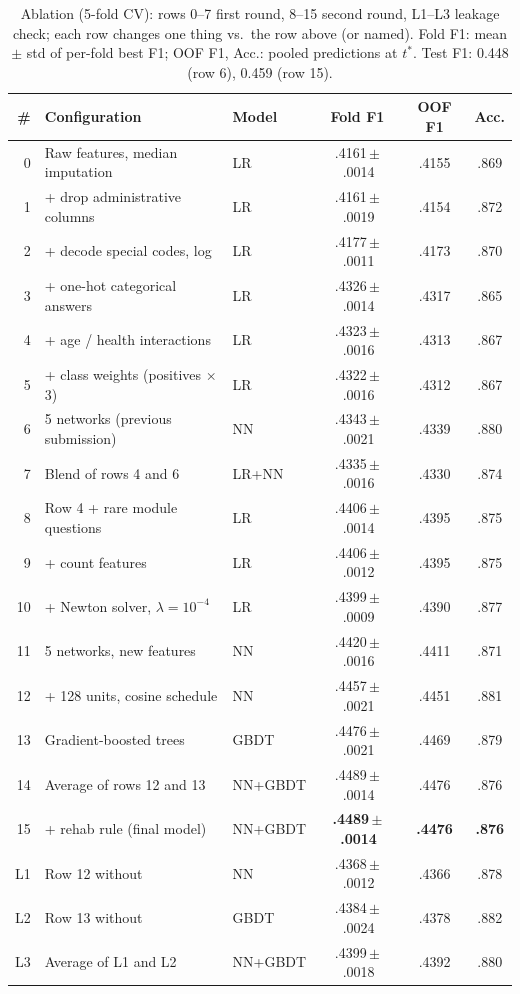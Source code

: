 \begin{table}[t]
\centering
\caption{Ablation (5-fold CV): rows 0--7 first round, 8--15 second round, L1--L3 leakage check; each row changes one thing vs.\ the row above (or named). Fold F1: mean $\pm$ std of per-fold best F1; OOF F1, Acc.: pooled predictions at $t^\ast$. Test F1: 0.448 (row 6), 0.459 (row 15).}
\label{tab:ablation}
\scriptsize
\setlength{\tabcolsep}{2.6pt}
\begin{tabular}{@{}rllccc@{}}
\toprule
\# & Configuration & Model & Fold F1 & OOF F1 & Acc. \\
\midrule
0 & Raw features, median imputation & LR & .4161\,$\pm$\,.0014 & .4155 & .869 \\
1 & + drop administrative columns & LR & .4161\,$\pm$\,.0019 & .4154 & .872 \\
2 & + decode special codes, log & LR & .4177\,$\pm$\,.0011 & .4173 & .870 \\
3 & + one-hot categorical answers & LR & .4326\,$\pm$\,.0014 & .4317 & .865 \\
4 & + age / health interactions & LR & .4323\,$\pm$\,.0016 & .4313 & .867 \\
5 & + class weights (positives $\times$3) & LR & .4322\,$\pm$\,.0016 & .4312 & .867 \\
6 & 5 networks (previous submission) & NN & .4343\,$\pm$\,.0021 & .4339 & .880 \\
7 & Blend of rows 4 and 6 & LR+NN & .4335\,$\pm$\,.0016 & .4330 & .874 \\
\midrule
8 & Row 4 + rare module questions & LR & .4406\,$\pm$\,.0014 & .4395 & .875 \\
9 & + count features & LR & .4406\,$\pm$\,.0012 & .4395 & .875 \\
10 & + Newton solver, $\lambda{=}10^{-4}$ & LR & .4399\,$\pm$\,.0009 & .4390 & .877 \\
11 & 5 networks, new features & NN & .4420\,$\pm$\,.0016 & .4411 & .871 \\
12 & + 128 units, cosine schedule & NN & .4457\,$\pm$\,.0021 & .4451 & .881 \\
13 & Gradient-boosted trees & GBDT & .4476\,$\pm$\,.0021 & .4469 & .879 \\
14 & Average of rows 12 and 13 & NN+GBDT & .4489\,$\pm$\,.0014 & .4476 & .876 \\
15 & + rehab rule (final model) & NN+GBDT & \textbf{.4489\,$\pm$\,.0014} & \textbf{.4476} & \textbf{.876} \\
\midrule
L1 & Row 12 without \hare{} & NN & .4368\,$\pm$\,.0012 & .4366 & .878 \\
L2 & Row 13 without \hare{} & GBDT & .4384\,$\pm$\,.0024 & .4378 & .882 \\
L3 & Average of L1 and L2 & NN+GBDT & .4399\,$\pm$\,.0018 & .4392 & .880 \\
\bottomrule
\end{tabular}
\vspace{-2mm}
\end{table}
